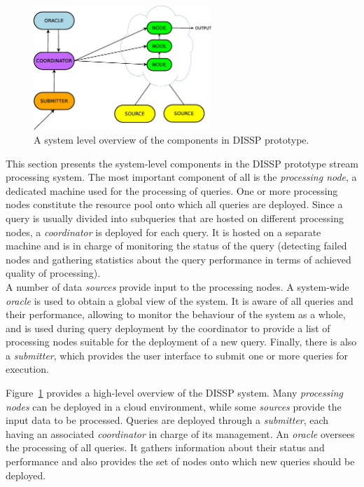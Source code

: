 \begin{figure}[b!]
	\centering
		\includegraphics[width=0.6\textwidth]{img/tesi/system_design} 
	\caption{A system level overview of the components in DISSP prototype. }
	\label{fig:sys}
\end{figure}
This section presents the system-level components in the DISSP prototype stream processing system. 
The most important component of all is the \emph{processing node}, a dedicated machine used for the
processing of queries. One or more processing nodes constitute the resource pool onto which all queries
are deployed. Since a query is usually divided into subqueries that are hosted on different processing
nodes, a \emph{coordinator} is deployed for each query. It is hosted on a separate machine and
is in charge of monitoring the status of the query (\ie detecting failed nodes and gathering statistics
about the query performance in terms of achieved quality of processing). \\
A number of data \emph{sources} provide input to the processing nodes. A system-wide \emph{oracle} is
used to obtain a global view of the system. It is aware of all queries and their performance, allowing
to monitor the behaviour of the system as a whole, and is used during query deployment by the
coordinator to provide a list of processing nodes suitable for the deployment of a new query. Finally,
there is also a \emph{submitter}, which provides the user interface to submit one or more queries
for execution. 

Figure~\ref{fig:sys} provides a high-level overview of the DISSP system. Many \emph{processing
nodes} can be deployed in a cloud environment, while some \emph{sources} provide the input data to be
processed.
Queries are deployed through a \emph{submitter}, each having an associated \emph{coordinator} in charge
of its management. An \emph{oracle} oversees the processing of all queries. It gathers information
about their status and performance and also provides the set of nodes onto which new queries
should be deployed.
\vspace{-10pt}

